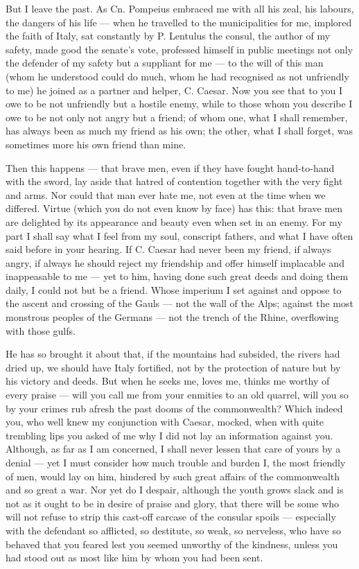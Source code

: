  But I leave the past. As Cn. Pompeius embraced me with all his zeal, his labours, the dangers of his life — when he travelled to the municipalities for me, implored the faith of Italy, sat constantly by P. Lentulus the consul, the author of my safety, made good the senate's vote, professed himself in public meetings not only the defender of my safety but a suppliant for me — to the will of this man (whom he understood could do much, whom he had recognised as not unfriendly to me) he joined as a partner and helper, C. Caesar. Now you see that to you I owe to be not unfriendly but a hostile enemy, while to those whom you describe I owe to be not only not angry but a friend; of whom one, what I shall remember, has always been as much my friend as his own; the other, what I shall forget, was sometimes more his own friend than mine.

 Then this happens — that brave men, even if they have fought hand-to-hand with the sword, lay aside that hatred of contention together with the very fight and arms. Nor could that man ever hate me, not even at the time when we differed. Virtue (which you do not even know by face) has this: that brave men are delighted by its appearance and beauty even when set in an enemy. For my part I shall say what I feel from my soul, conscript fathers, and what I have often said before in your hearing. If C. Caesar had never been my friend, if always angry, if always he should reject my friendship and offer himself implacable and inappeasable to me — yet to him, having done such great deeds and doing them daily, I could not but be a friend. Whose imperium I set against and oppose to the ascent and crossing of the Gauls — not the wall of the Alps; against the most monstrous peoples of the Germans — not the trench of the Rhine, overflowing with those gulfs.

 He has so brought it about that, if the mountains had subsided, the rivers had dried up, we should have Italy fortified, not by the protection of nature but by his victory and deeds. But when he seeks me, loves me, thinks me worthy of every praise — will you call me from your enmities to an old quarrel, will you so by your crimes rub afresh the past dooms of the commonwealth? Which indeed you, who well knew my conjunction with Caesar, mocked, when with quite trembling lips you asked of me why I did not lay an information against you. Although, as far as I am concerned, I shall never lessen that care of yours by a denial — yet I must consider how much trouble and burden I, the most friendly of men, would lay on him, hindered by such great affairs of the commonwealth and so great a war. Nor yet do I despair, although the youth grows slack and is not as it ought to be in desire of praise and glory, that there will be some who will not refuse to strip this cast-off carcase of the consular spoils — especially with the defendant so afflicted, so destitute, so weak, so nerveless, who have so behaved that you feared lest you seemed unworthy of the kindness, unless you had stood out as most like him by whom you had been sent.

